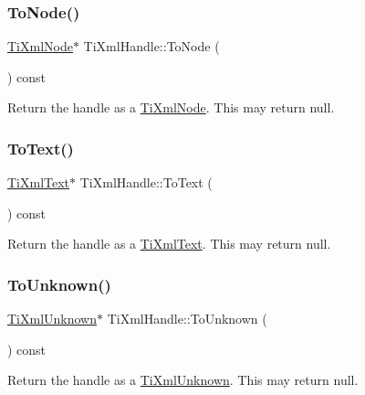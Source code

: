 \subsubsection{\texorpdfstring{To\+Node()}{ToNode()}}
{\footnotesize\ttfamily \hyperlink{classTiXmlNode}{Ti\+Xml\+Node}$\ast$ Ti\+Xml\+Handle\+::\+To\+Node (\begin{DoxyParamCaption}{ }\end{DoxyParamCaption}) const\hspace{0.3cm}{\ttfamily [inline]}}

Return the handle as a \hyperlink{classTiXmlNode}{Ti\+Xml\+Node}. This may return null. \mbox{\label{classTiXmlHandle_abde286bce1d5db0d20ec30e573278cdf}} 
\subsubsection{\texorpdfstring{To\+Text()}{ToText()}}
{\footnotesize\ttfamily \hyperlink{classTiXmlText}{Ti\+Xml\+Text}$\ast$ Ti\+Xml\+Handle\+::\+To\+Text (\begin{DoxyParamCaption}{ }\end{DoxyParamCaption}) const\hspace{0.3cm}{\ttfamily [inline]}}

Return the handle as a \hyperlink{classTiXmlText}{Ti\+Xml\+Text}. This may return null. \mbox{\label{classTiXmlHandle_a450ec91dac1ded02d72eb918d062ad31}} 
\subsubsection{\texorpdfstring{To\+Unknown()}{ToUnknown()}}
{\footnotesize\ttfamily \hyperlink{classTiXmlUnknown}{Ti\+Xml\+Unknown}$\ast$ Ti\+Xml\+Handle\+::\+To\+Unknown (\begin{DoxyParamCaption}{ }\end{DoxyParamCaption}) const\hspace{0.3cm}{\ttfamily [inline]}}

Return the handle as a \hyperlink{classTiXmlUnknown}{Ti\+Xml\+Unknown}. This may return null. \mbox{\label{classTiXmlHandle_a12b32f098c7daa5facbc04e9618262c5}} 
